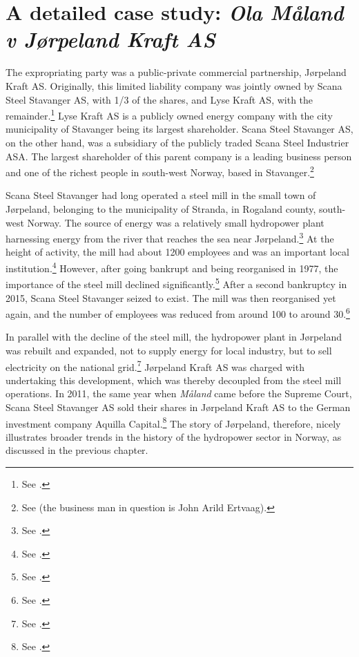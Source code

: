 \section{A detailed case study: {\it Ola Måland v Jørpeland Kraft AS}}\label{sec:jorpeland}

The expropriating party was a public-private commercial partnership, Jørpeland Kraft AS. Originally, this limited liability company was jointly owned by Scana Steel Stavanger AS, with 1/3 of the shares, and Lyse Kraft AS, with the remainder.\footnote{See \cite[2]{jorpeland09}.} Lyse Kraft AS is a publicly owned energy company with the city municipality of Stavanger being its largest shareholder. Scana Steel Stavanger AS, on the other hand, was a subsidiary of the publicly traded Scana Steel Industrier ASA. The largest shareholder of this parent company is a leading business person and one of the richest people in south-west Norway, based in Stavanger.\footnote{See \cite{birkevold09} (the business man in question is John Arild Ertvaag).}

Scana Steel Stavanger had long operated a steel mill in the small town of Jørpeland, belonging to the municipality of Stranda, in Rogaland county, south-west Norway. The source of energy was a relatively small hydropower plant harnessing energy from the river that reaches the sea near Jørpeland.\footnote{See \cite{aadland09}.} At the height of activity, the mill had about 1200 employees and was an important local institution.\footnote{See \cite[11]{meland82}.} However, after going bankrupt and being reorganised in 1977, the importance of the steel mill declined significantly.\footnote{See \cite[8-15]{meland82}.} After a second bankruptcy in 2015, Scana Steel Stavanger seized to exist. The mill was then reorganised yet again, and the number of employees was reduced from around 100 to around 30.\footnote{See \cite{jossang15}.}

In parallel with the decline of the steel mill, the hydropower plant in Jørpeland was rebuilt and expanded, not to supply energy for local industry, but to sell electricity on the national grid.\footnote{See \cite{aadland09}.} Jørpeland Kraft AS was charged with undertaking this development, which was thereby decoupled from the steel mill operations. In 2011, the same year when {\it Måland} came before the Supreme Court, Scana Steel Stavanger AS sold their shares in Jørpeland Kraft AS to the German investment company Aquilla Capital.\footnote{See \cite{sandvik11}.} The story of Jørpeland, therefore, nicely illustrates broader trends in the history of the hydropower sector in Norway, as discussed in the previous chapter.

